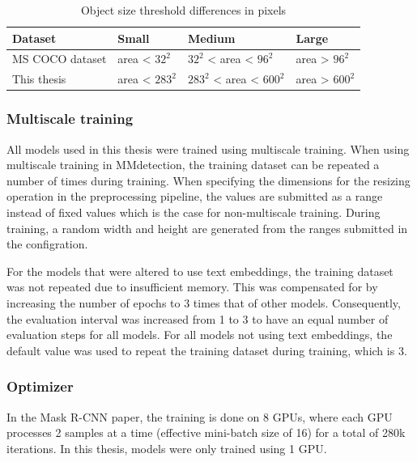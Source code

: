 \documentclass[oneside, english, bibtex]{kththesis}
\begin{document}
\begin{table}[H]
  \begin{center}
    \caption{Object size threshold differences in pixels}
    \label{tab:objectsizes}
    \begin{tabular}{l|l|l|l} %
    \textbf{Dataset} & \textbf{Small} & \textbf{Medium} & \textbf{Large}  \\
    \hline
    MS COCO dataset & area < $32^2$ & $32^2$ < area < $96^2$ & area > $96^2$  \\    \hline
    This thesis & area < $283^2$ & $283^2$ < area < $600^2$ & area > $600^2$ \\    \hline
    \end{tabular}
  \end{center}
\end{table}

\subsubsection{Multiscale training}

All models used in this thesis were trained using multiscale training. When using multiscale training in MMdetection, the training dataset can be repeated a number of times during training. When specifying the dimensions for the resizing operation in the preprocessing pipeline, the values are submitted as a range instead of fixed values which is the case for non-multiscale training. During training, a random width and height are generated from the ranges submitted in the configration. 

For the models that were altered to use text embeddings, the training dataset was not repeated due to insufficient memory. This was compensated for by increasing the number of epochs to 3 times that of other models. Consequently, the evaluation interval was increased from 1 to 3 to have an equal number of evaluation steps for all models. For all models not using text embeddings, the default value was used to repeat the training dataset during training, which is 3.

\subsubsection{Optimizer}

In the Mask R-CNN paper, the training is done on 8 GPUs, where each GPU processes 2 samples at a time (effective mini-batch size of 16) for a total of 280k iterations.
In this thesis, models were only trained using 1 GPU.
\end{document}
